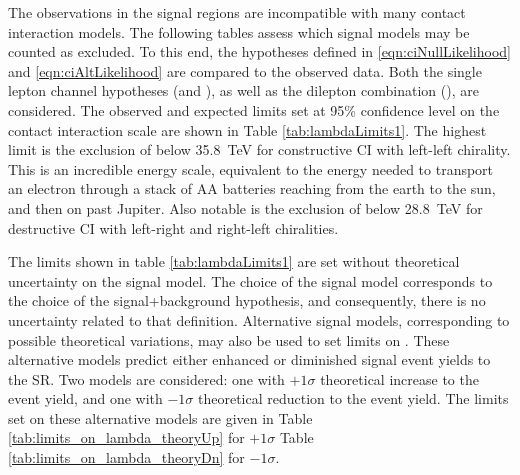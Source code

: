 The observations in the signal regions are incompatible with many contact interaction models.
The following tables assess which signal models may be counted as excluded.
To this end, the hypotheses defined in \ref{eqn:ciNullLikelihood} and \ref{eqn:ciAltLikelihood} are compared to the observed data.
Both the single lepton channel hypotheses (\ee and \mm), as well as the dilepton combination (\ll), are considered.
The observed and expected limits set at 95\% confidence level on the contact interaction scale \lam are shown in Table \ref{tab:lambdaLimits1}.
The highest limit is the exclusion of \lam below 35.8~TeV for \ll constructive CI with left-left chirality.
This is an incredible energy scale, equivalent to the energy needed to transport an electron through a stack of AA batteries reaching from the earth to the sun, and then on past Jupiter.
Also notable is the exclusion of \lam below 28.8~TeV for \ll destructive CI with left-right and right-left chiralities.


The limits shown in table \ref{tab:lambdaLimits1} are set without theoretical uncertainty on the signal model.
The choice of the signal model corresponds to the choice of the signal+background hypothesis, and consequently, there is no uncertainty related to that definition.
Alternative signal models, corresponding to possible theoretical variations, may also be used to set limits on \lam.
These alternative models predict either enhanced or diminished signal event yields to the SR.
Two models are considered: one with $+1\sigma$ theoretical increase to the event yield, and one with $-1\sigma$ theoretical reduction to the event yield.
The limits set on these alternative models are given in Table \ref{tab:limits_on_lambda_theoryUp} for $+1\sigma$ Table \ref{tab:limits_on_lambda_theoryDn} for $-1\sigma$.

